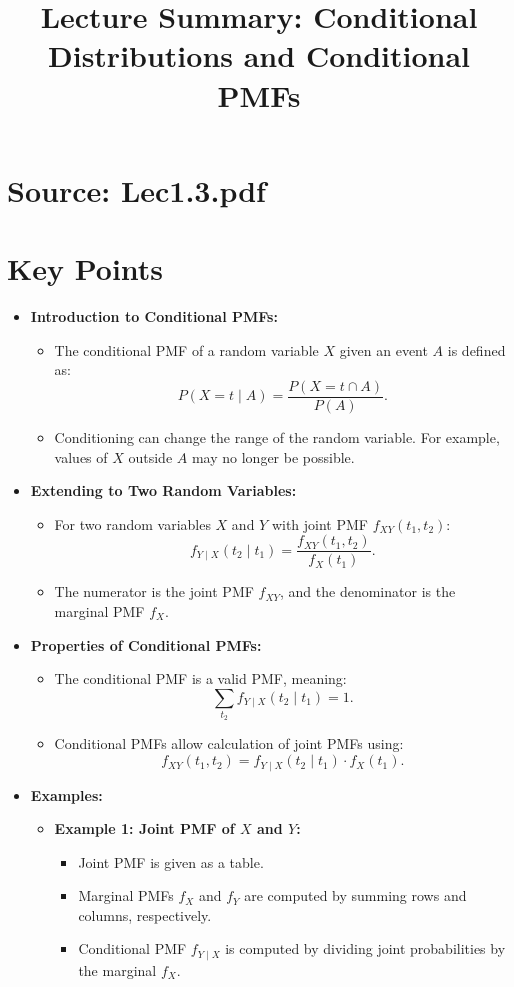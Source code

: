 \documentclass{article}
\title{Lecture Summary: Conditional Distributions and Conditional PMFs}
\author{}
\date{}
\begin{document}
\maketitle

\section*{Source: Lec1.3.pdf}

\section*{Key Points}

\begin{itemize}
  \item \textbf{Introduction to Conditional PMFs:}
    \begin{itemize}
      \item The conditional PMF of a random variable $X$ given an event $A$ is defined as:
        \[
          P(X = t \mid A) = \frac{P(X = t \cap A)}{P(A)}.
        \]
      \item Conditioning can change the range of the random variable. For example, values of $X$ outside $A$ may no longer be possible.
    \end{itemize}

  \item \textbf{Extending to Two Random Variables:}
    \begin{itemize}
      \item For two random variables $X$ and $Y$ with joint PMF $f_{XY}(t_1, t_2)$:
        \[
          f_{Y \mid X}(t_2 \mid t_1) = \frac{f_{XY}(t_1, t_2)}{f_X(t_1)}.
        \]
      \item The numerator is the joint PMF $f_{XY}$, and the denominator is the marginal PMF $f_X$.
    \end{itemize}

  \item \textbf{Properties of Conditional PMFs:}
    \begin{itemize}
      \item The conditional PMF is a valid PMF, meaning:
        \[
          \sum_{t_2} f_{Y \mid X}(t_2 \mid t_1) = 1.
        \]
      \item Conditional PMFs allow calculation of joint PMFs using:
        \[
          f_{XY}(t_1, t_2) = f_{Y \mid X}(t_2 \mid t_1) \cdot f_X(t_1).
        \]
    \end{itemize}

  \item \textbf{Examples:}
    \begin{itemize}
      \item \textbf{Example 1: Joint PMF of $X$ and $Y$:}
        \begin{itemize}
          \item Joint PMF is given as a table.
          \item Marginal PMFs $f_X$ and $f_Y$ are computed by summing rows and columns, respectively.
          \item Conditional PMF $f_{Y \mid X}$ is computed by dividing joint probabilities by the marginal $f_X$.
        \end{itemize}


\end{itemize}
\end{itemize}
\end{document}
